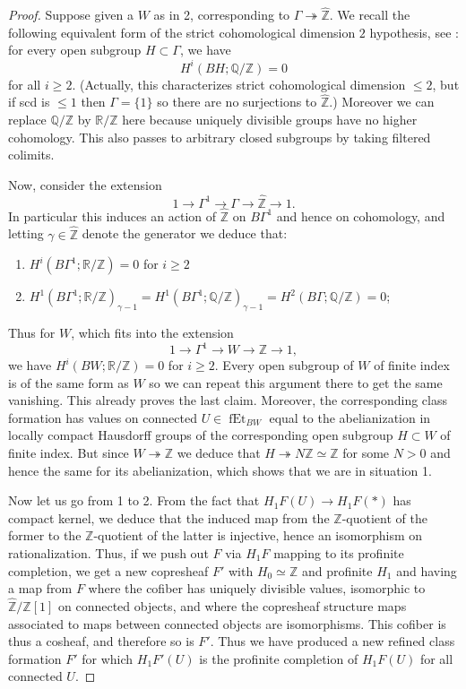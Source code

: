 \documentclass[12pt]{article}
\theoremstyle{definition}
\newcommand{\on}{\operatorname}
\newcommand{\mbb}{\mathbb}
\newcommand{\wh}{\widehat}
\begin{document}
\begin{proof}
Suppose given a $W$ as in 2, corresponding to $\Gamma\twoheadrightarrow\wh{\mbb{Z}}$.  We recall the following equivalent form of the strict cohomological dimension $2$ hypothesis, see \cite{galcoh}: for every open subgroup $H\subset \Gamma$, we have
$$H^i(BH;\mbb{Q}/\mbb{Z})=0$$
for all $i\geq 2$.  (Actually, this characterizes strict cohomological dimension $\leq 2$, but if scd is $\leq 1$ then $\Gamma=\{1\}$ so there are no surjections to $\wh{\mbb{Z}}$.)  Moreover we can replace $\mbb{Q}/\mbb{Z}$ by $\mbb{R}/\mbb{Z}$ here because uniquely divisible groups have no higher cohomology.  This also passes to arbitrary closed subgroups by taking filtered colimits.

Now, consider the extension
$$1\to \Gamma^1\to\Gamma\to\wh{\mbb{Z}}\to 1.$$
In particular this induces an action of $\wh{\mbb{Z}}$ on $B\Gamma^1$ and hence on cohomology, and letting $\gamma\in\wh{\mbb{Z}}$ denote the generator we deduce that:
\begin{enumerate}
\item $H^i(B\Gamma^1;\mbb{R}/\mbb{Z})=0$ for $i\geq 2$
\item $H^1(B\Gamma^1;\mbb{R}/\mbb{Z})_{\gamma-1}=H^1(B\Gamma^1;\mbb{Q}/\mbb{Z})_{\gamma-1}=H^2(B\Gamma;\mbb{Q}/\mbb{Z})=0$;
\end{enumerate}

Thus for $W$, which fits into the extension
$$ 1\to \Gamma^1 \to W \to \mbb{Z} \to 1,$$
we have $H^i(BW;\mbb{R}/\mbb{Z})=0$ for $i\geq 2$.  Every open subgroup of $W$ of finite index is of the same form as $W$ so we can repeat this argument there to get the same vanishing. This already proves the last claim.  Moreover, the corresponding class formation has values on connected $U\in\on{fEt}_{BW}$ equal to the abelianization in locally compact Hausdorff groups of the corresponding open subgroup $H\subset W$ of finite index.  But since $W\twoheadrightarrow\mbb{Z}$ we deduce that $H\twoheadrightarrow N\mbb{Z}\simeq\mbb{Z}$ for some $N>0$ and hence the same for its abelianization, which shows that we are in situation 1.

Now let us go from 1 to 2.  From the fact that $H_1F(U)\to H_1F(\ast)$ has compact kernel, we deduce that the induced map from the $\mbb{Z}$-quotient of the former to the $\mbb{Z}$-quotient of the latter is injective, hence an isomorphism on rationalization.  Thus, if we push out $F$ via $H_1F$ mapping to its profinite completion, we get a new copresheaf $F'$ with $H_0\simeq\mbb{Z}$ and profinite $H_1$ and having a map from $F$ where the cofiber has uniquely divisible values, isomorphic to $\wh{\mbb{Z}}/\mbb{Z}[1]$ on connected objects, and where the copresheaf structure maps associated to maps between connected objects are isomorphisms.  This cofiber is thus a cosheaf, and therefore so is $F'$.  Thus we have produced a new refined class formation $F'$ for which $H_1F'(U)$ is the profinite completion of $H_1F(U)$ for all connected $U$.


\end{proof}
\end{document}
